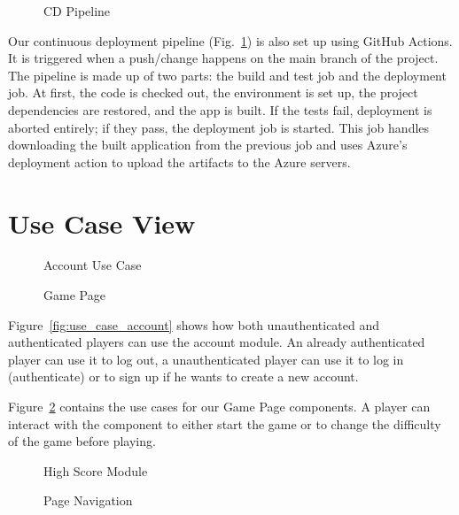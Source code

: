 \documentclass[11pt,a4paper]{article}
\newcommand{\inputdiagram}[1]{}
\newcommand{\textwidthdiagram}[2][1]{%
  \resizebox{#1\textwidth}{!}{\inputdiagram{#2}}%
}
\begin{document}
\begin{figure}[H]
    \centering
    \textwidthdiagram[0.8]{CD.tex}
    \caption{CD Pipeline}
    \label{fig:CD_pipeline}
\end{figure}
Our continuous deployment pipeline (Fig.~\ref{fig:CD_pipeline}) is also set up using GitHub Actions. It is triggered when a push/change happens on the main branch of the project. The pipeline is made up of two parts: the build and test job and the deployment job. At first, the code is checked out, the environment is set up, the project dependencies are restored, and the app is built. If the tests fail, deployment is aborted entirely; if they pass, the deployment job is started. This job handles downloading the built application from the previous job and uses Azure's deployment action to upload the artifacts to the Azure servers.

\section{Use Case View}

\begin{figure}[H]
    \centering
    \begin{minipage}[b]{0.48\textwidth}
        \centering
        \textwidthdiagram{use_case_account.tex}
        \caption{Account Use Case}
        \label{fig:use_case_account}
    \end{minipage}
    \hfil
    \begin{minipage}[b]{0.48\textwidth}
        \centering
        \textwidthdiagram{use_case_game_page.tex}
        \caption{Game Page}
        \label{fig:use_case_game_page}
    \end{minipage}
\end{figure}

Figure~\ref{fig:use_case_account} shows how both unauthenticated and authenticated players can use the account module. An already authenticated player can use it to log out, a unauthenticated player can use it to log in (authenticate) or to sign up if he wants to create a new account.

Figure~\ref{fig:use_case_game_page} contains the use cases for our Game Page components. A player can interact with the component to either start the game or to change the difficulty of the game before playing.

\begin{figure}[H]
    \centering
    \begin{minipage}[b]{0.48\textwidth}
        \textwidthdiagram{use_case_high_score.tex}
        \caption{High Score Module}
        \label{fig:use_case_high_score}
    \end{minipage}
    \hfil
    \begin{minipage}[b]{0.48\textwidth}
        \centering
        \textwidthdiagram{use_case_navigation.tex}
        \caption{Page Navigation}
        \label{fig:use_case_navigation}
    \end{minipage}
\end{figure}
\end{document}
